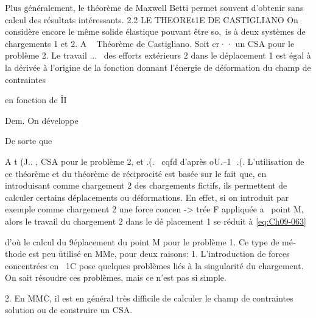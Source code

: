 Plus généralement, le 	théorème de Maxwell Betti permet souvent 
d'obtenir sans calcul 	des résultats intéressants. 
2.2 LE THEOREt1E DE CASTIGLIANO 
On considère encore le même solide élastique pouvant être so,~is à deux systèmes de chargements 1 et 2. 
A ~ 
Théorème de Castigliano. Soit cr·· un CSA pour le problème 2. Le travail 
...~ 
des efforts extérieurs 2 dans le déplacement 1 est égal à la dérivée à l'origine de la fonction donnant l'énergie de déformation du champ de 
contraintes 

en fonction de ÎI 

Dem. On développe 

De sorte que 

A t
(J.. , CSA pour le problème 2, et 
.(.~ 
cqfd 
d'après oU.--1  
.(. 
L'utilisation de ce théorème et du théorème de réciprocité est basée sur le fait que, en introduisant comme chargement 2 des chargements fictifs, ils permettent de calculer certains déplacements ou déformations. En effet, si on introduit par exemple comme chargement 2 une force concen
->
trée  F  appliquée  a~  point M,  alors  le  travail  du  chargement  2 dans  le dé­ 
placement  1  se  réduit  à  
\eqref{eq:Ch09-063}  

d'où le calcul du 9éplacement du point M pour le problème 1. Ce type de mé­thode est peu ütilisé en MMe, pour deux raisons: 
1. 
L'introduction de forces concentrées en ~1C pose quelques problèmes liés à la singularité du chargement. On sait résoudre ces problèmes, mais ce n'est pas si simple. 

2. 
En MMC, il est en général très difficile de calculer le champ de contrain­tes solution ou de construire un CSA. 


